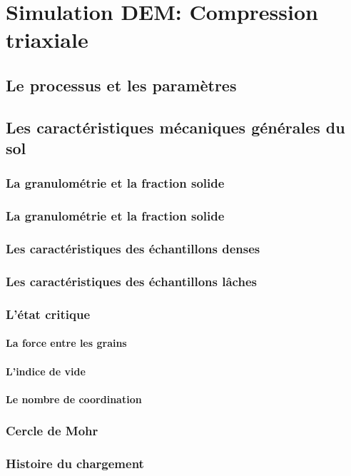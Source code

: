 \documentclass[a4paper,12pt]{report}
\begin{document}
\section{Simulation DEM: Compression triaxiale}
\subsection{Le processus et les paramètres}
\subsection{Les caractéristiques mécaniques générales du sol}
\subsubsection{La granulométrie et la fraction solide}
\subsubsection{La granulométrie et la fraction solide}
\subsubsection{Les caractéristiques des échantillons denses}
\subsubsection{Les caractéristiques des échantillons lâches}
\subsubsection{L'état critique}
\paragraph{La force entre les grains}
\paragraph{L'indice de vide}
\paragraph{Le nombre de coordination}
\subsubsection{Cercle de Mohr}
\subsubsection{Histoire du chargement}
\end{document}
